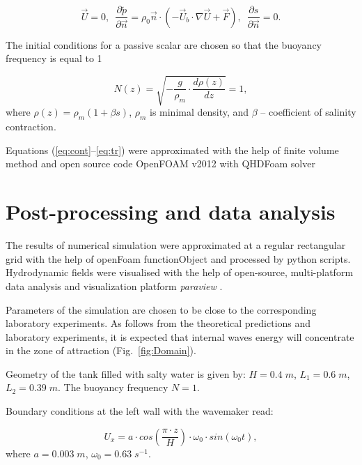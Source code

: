 \documentclass[a4wide,fontsize=12pt]{article}
\begin{document}
\begin{equation}\label{eq:qhd_walls}
        \vec{U} = 0, \,\,\, \frac{\partial \tilde p}{ \partial \vec{n}} = \rho_0 \vec n \cdot \left ( -\vec U_b \cdot \nabla \vec U + \vec F \right), \,\,\, \frac{\partial s}{ \partial \vec{n}} = 0.
\end{equation}

The initial conditions for a passive scalar are chosen so that the buoyancy frequency is equal to 1

\begin{equation}
    N(z) = \sqrt{- \frac{g}{\rho_m}\cdot\frac{d \rho(z)}{dz}} = 1,
\end{equation}
\noindent
where $\rho(z) = \rho_m(1+\beta s)$, $\rho_m$ is minimal density,  and $\beta$ -- coefficient of salinity contraction. 

Equations (\ref{eq:cont}--\ref{eq:tr}) were approximated with the help of finite volume method and open source code OpenFOAM v2012 with QHDFoam solver \cite{QGDFOam}

\section{Post-processing and data analysis}

The results of numerical simulation were approximated at a regular rectangular grid with the help of openFoam functionObject and processed by python scripts. Hydrodynamic fields were visualised with the help of open-source, multi-platform data analysis and visualization platform \emph{paraview} \cite{paraview}. 


Parameters of the simulation are chosen to be close to the corresponding laboratory experiments.
As follows from the theoretical predictions and laboratory experiments, it is expected that internal waves energy will concentrate in the zone of attraction (Fig.~\ref{fig:Domain}). 

Geometry of the tank filled with salty water is given by: $H = 0.4 \; m$, $L_1=0.6 \; m$, $L_2 = 0.39 \; m$.
The buoyancy frequency $N=1$.

Boundary conditions at the left wall with the wavemaker read:

\begin{equation}
    U_x = a\cdot cos\left(\frac{\pi \cdot z}{H}\right)\cdot \omega_0 \cdot  sin(\omega_0 t),
    \label{eq:wmc}
\end{equation}
where $a = 0.003 \; m$, $\omega_0 = 0.63 \; s^{-1}$.
\end{document}
